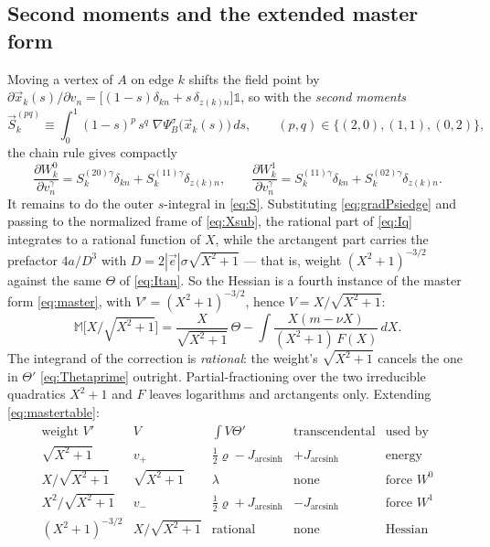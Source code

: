\documentclass[11pt]{article}
\numberwithin{equation}{section}
\newcommand{\vv}[1]{\vec{#1}}
\newcommand{\half}{\tfrac{1}{2}}
\DeclareMathOperator{\arcsinh}{arcsinh}
\begin{document}
\subsection{Second moments and the extended master form}
Moving a vertex of $A$ on edge $k$ shifts the field point by
$\partial\vv x_k(s)/\partial v_n=\big[(1-s)\delta_{kn}+s\,\delta_{z(k)n}\big]\mathbb 1$, so with the
\emph{second moments}
\begin{equation}\label{eq:S}
  \vv S_k^{(pq)}\equiv\int_0^1(1-s)^p\,s^q\;\nabla\Psi_B^\sigma\big(\vv x_k(s)\big)\,ds,
  \qquad (p,q)\in\{(2,0),(1,1),(0,2)\},
\end{equation}
the chain rule gives compactly
\begin{equation}\label{eq:dW}
  \frac{\partial W_k^{0}}{\partial v_n^\gamma}=S_k^{(20)\gamma}\delta_{kn}+S_k^{(11)\gamma}\delta_{z(k)n},
  \qquad
  \frac{\partial W_k^{1}}{\partial v_n^\gamma}=S_k^{(11)\gamma}\delta_{kn}+S_k^{(02)\gamma}\delta_{z(k)n}.
\end{equation}
It remains to do the outer $s$-integral in \eqref{eq:S}. Substituting \eqref{eq:gradPsiedge} and passing
to the normalized frame of \eqref{eq:Xsub}, the rational part of \eqref{eq:Iq} integrates to a rational
function of $X$, while the arctangent part carries the prefactor $4a/D^3$ with
$D=2|\vv e|\sigma\sqrt{X^2+1}$ --- that is, weight $(X^2+1)^{-3/2}$ against the same
$\Theta$ of \eqref{eq:Itan}. So the Hessian is a fourth instance of the master form \eqref{eq:master},
with $V'=(X^2+1)^{-3/2}$, hence $V=X/\sqrt{X^2+1}$:
\begin{equation}\label{eq:master4}
  \mathbb M\big[X/\sqrt{X^2+1}\big]=\frac{X}{\sqrt{X^2+1}}\,\Theta
  -\int\frac{X(m-\nu X)}{(X^2+1)\,F(X)}\,dX .
\end{equation}
The integrand of the correction is \emph{rational}: the weight's $\sqrt{X^2+1}$ cancels the one in
$\Theta'$ \eqref{eq:Thetaprime} outright. Partial-fractioning over the two irreducible quadratics
$X^2+1$ and $F$ leaves logarithms and arctangents only. Extending \eqref{eq:mastertable}:
\begin{equation}\label{eq:mastertable4}
  \begin{array}{lllll}
    \text{weight }V' & V & \int V\Theta' & \text{transcendental} & \text{used by}\\[2pt]
    \sqrt{X^2+1} & v_+ & \half\varrho-J_{\arcsinh} & +J_{\arcsinh} & \text{energy}\\[2pt]
    X/\sqrt{X^2+1} & \sqrt{X^2+1} & \lambda & \text{none} & \text{force }W^0\\[2pt]
    X^2/\sqrt{X^2+1} & v_- & \half\varrho+J_{\arcsinh} & -J_{\arcsinh} & \text{force }W^1\\[2pt]
    (X^2+1)^{-3/2} & X/\sqrt{X^2+1} & \text{rational} & \text{none} & \text{Hessian}
  \end{array}
\end{equation}
\end{document}
